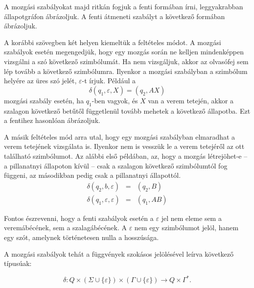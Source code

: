 \documentclass[a4paper]{article}
\begin{document}
A mozgási szabályokat majd ritkán fogjuk a fenti formában írni,
leggyakrabban állapotgráfon ábrázoljuk. A fenti átmeneti szabályt a
következő formában ábrázoljuk.


A korábbi szövegben két helyen kiemeltük a feltételes módot.
A mozgási szabályok esetén megengedjük, hogy egy mozgás során ne kelljen
mindenképpen vizsgálni a szó következő szimbólumát. Ha nem vizsgáljuk,
akkor az olvasófej sem lép tovább a következő szimbólumra. Ilyenkor a
mozgási szabályban a szimbólum helyére az üres szó jelét,
$\varepsilon$-t írjuk. Például a
\[\delta(q_1, \varepsilon, X) = (q_2, AX)\]
mozgási szabály esetén, ha $q_1$-ben vagyok, és $X$ van a verem tetején,
akkor a szalagon következő betűtől függetlenül tovább mehetek a
következő állapotba. Ezt a fentihez hasonlóan ábrázoljuk.


A másik feltételes mód arra utal, hogy egy mozgási szabályban elmaradhat
a verem tetejének vizsgálata is. Ilyenkor nem is vesszük le a verem
tetejéről az ott található szimbólumot. Az alábbi első példában, az,
hogy a mozgás létrejöhet-e -- a pillanatnyi állapoton kívül -- csak a
szalagon következő szimbólumtól fog függeni, az másodikban pedig csak a
pillanatnyi állapottól.
\begin{eqnarray*}
    \delta(q_2, b, \varepsilon) &=& (q_2, B)\\
    \delta(q_1, \varepsilon, \varepsilon) &=& (q_1, AB)
\end{eqnarray*}

Fontos észrevenni, hogy a fenti szabályok esetén a $\varepsilon$ jel nem
eleme sem a veremábécének, sem a szalagábécének. A $\varepsilon$ nem egy
szimbólumot jelöl, hanem egy szót, amelynek történetesen nulla a
hosszúsága.

A mozgási szabályok tehát a függvények szokásos jelölésével leírva
következő típusúak:

\[\delta:
 Q\times (\Sigma \cup \{\varepsilon\}) \times (\Gamma \cup \{\varepsilon\})
 \longrightarrow
 Q \times \Gamma^*.
\]
\end{document}
